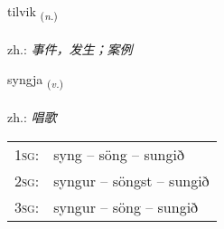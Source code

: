 \documentclass[frontgrid, backgrid]{flacards}\usepackage[]{graphicx}\usepackage[]{xcolor}
\begin{document}
\renewcommand{\flhead}{\vskip5pt \fboxsep=0pt {\small\bfseries\footnotesize Nafnorð | 名词}}
\renewcommand{\fcfoot}{\vskip5pt \fboxsep=0pt \hspace{2pt}{\small\bfseries\footnotesize 1K}}

\renewcommand{\blhead}{\vskip5pt {\small\bfseries\footnotesize Nafnorð | 名词 }}
\renewcommand{\bcfoot}{\vskip5pt \hspace{2pt}{\small\bfseries\footnotesize 1K}}


{tilvik \small{\textsubscript{(\textit{n.})}} \\[1ex] %
\textphonetic{[tʰɪlvɪk]} \\
zh.: \emph{事件，发生；案例} \\  [2ex]
\renewcommand*{\arraystretch}{0.8}
}

\renewcommand{\flhead}{\vskip5pt \fboxsep=0pt {\small\bfseries\footnotesize Sagnorð | 动词}}
\renewcommand{\fcfoot}{\vskip5pt \fboxsep=0pt \hspace{2pt}{\small\bfseries\footnotesize 1K}}

\renewcommand{\blhead}{\vskip5pt {\small\bfseries\footnotesize Sagnorð | 动词 }}
\renewcommand{\bcfoot}{\vskip5pt \hspace{2pt}{\small\bfseries\footnotesize 1K}}


{syngja \small{\textsubscript{(\textit{v.})}} \\[1ex] %
\textphonetic{[siɲca]} \\
zh.: \emph{唱歌} \\  [2ex]
\renewcommand*{\arraystretch}{0.8}
\begin{tabular}{p{1cm}l}
\textsc{1sg}: & syng -- söng -- sungið \\ 
\textsc{2sg}: & syngur -- söngst -- sungið \\ 
\textsc{3sg}: & syngur -- söng -- sungið \\ 
\end{tabular}
}
\end{document}
